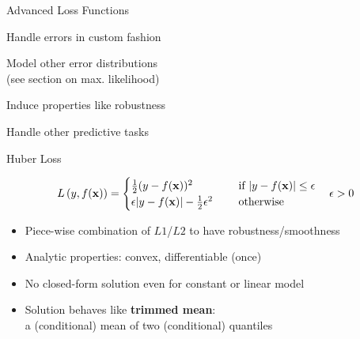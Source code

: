 \documentclass[11pt,compress,t,notes=noshow, xcolor=table]{beamer}
\begin{document}

\begin{framei}[sep=M, fs=large]{Advanced Loss Functions }

\item Handle errors in custom fashion
\item Model other error distributions\\
(see section on max. likelihood)
\item Induce properties like robustness
\item Handle other predictive tasks

\vfill



\end{framei}

\begin{frame}{Huber Loss}

$$
L\left(y, f(\mathbf{x})\right) = \begin{cases}
\frac{1}{2}(y - f(\mathbf{x}))^2  & \text{ if } |y - f(\mathbf{x})| \le \epsilon \\
\epsilon |y - f(\mathbf{x})|-\frac{1}{2}\epsilon^2 \quad & \text{ otherwise }
\end{cases} \quad \epsilon > 0
$$

\begin{itemize}
\item Piece-wise combination of $L1$/$L2$ to have robustness/smoothness
\item Analytic properties: convex, differentiable (once)
\end{itemize}




\begin{itemize}
\item No closed-form solution even for constant or linear model
\item Solution behaves like \textbf{trimmed mean}:\\
a (conditional) mean of two (conditional) quantiles  
\end{itemize}

\end{frame}
\end{document}
